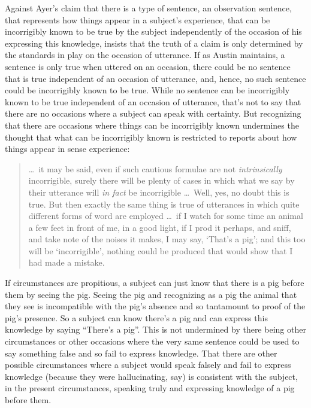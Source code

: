 \documentclass[12pt]{article}
\begin{document}
Against Ayer's \citeyearpar{Ayer:1958kx} claim that there is a type of sentence, an observation sentence, that represents how things appear in a subject's experience, that can be incorrigibly known to be true by the subject independently of the occasion of his expressing this knowledge, \citet{Austin:1962lr} insists that the truth of a claim is only determined by the standards in play on the occasion of utterance. If as Austin maintains, a sentence is only true when uttered on an occasion, there could be no sentence that is true independent of an occasion of utterance, and, hence, no such sentence could be incorrigibly known to be true. While no sentence can be incorrigibly known to be true independent of an occasion of utterance, that's not to say that there are no occasions where a subject can speak with certainty. But recognizing that there are occasions where things can be incorrigibly known undermines the thought that what can be incorrigibly known is restricted to reports about how things appear in sense experience:
\begin{quote}
    \ldots\ it may be said, even if such cautious formulae are not \emph{intrinsically} incorrigible, surely there will be plenty of cases in which what we say by their utterance will \emph{in fact} be incorrigible \ldots\ Well, yes, no doubt this is true. But then exactly the same thing is true of utterances in which quite different forms of word are employed \ldots\ if I watch for some time an animal a few feet in front of me, in a good light, if I prod it perhaps, and sniff, and take note of the noises it makes, I may say, `That’s a pig’; and this too will be `incorrigible’, nothing could be produced that would show that I had made a mistake. \citep[114--5]{Austin:1962lr}
\end{quote}
If circumstances are propitious, a subject can just know that there is a pig before them by seeing the pig. Seeing the pig and recognizing as a pig the animal that they see is incompatible with the pig's absence and so tantamount to proof of the pig's presence. So a subject can know there's a pig and can express this knowledge by saying ``There's a pig''. This is not undermined by there being other circumstances or other occasions where the very same sentence could be used to say something false and so fail to express knowledge. That there are other possible circumstances where a subject would speak falsely and fail to express knowledge (because they were hallucinating, say) is consistent with the subject, in the present circumstances, speaking truly and expressing knowledge of a pig before them. 
\end{document}
